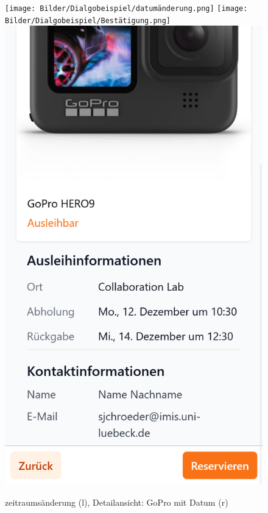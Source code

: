 \begin{figure}[p]
    \centering
    \texttt{[image: Bilder/Dialgobeispiel/datumänderung.png]}\hspace{1em}
    \texttt{[image: Bilder/Dialgobeispiel/Bestätigung.png]} \hspace{1em}
    \includegraphics[scale=0.17]{Bilder/Dialgobeispiel/Zsuammenfassung.png}
    \caption[Dialogbeispiel 2]{zeitraumsänderung (l), Detailansicht: GoPro mit Datum (r)}\label{fig:geandert}
\end{figure}

